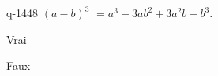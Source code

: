 \begin{truefalse}{q-1448}
$(a-b)^3$ $=a^3-3ab^2+3a^2b-b^3$.
\item Vrai
\item* Faux
\end{truefalse}

